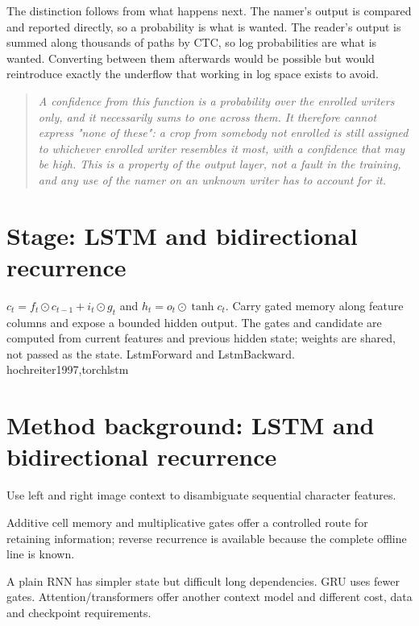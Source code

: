 The distinction follows from what happens next. The namer's output is compared and reported directly, so a probability is what is wanted. The reader's output is summed along thousands of paths by CTC, so log probabilities are what is wanted. Converting between them afterwards would be possible but would reintroduce exactly the underflow that working in log space exists to avoid.


\begin{quote}\small\itshape A confidence from this function is a probability over the enrolled writers only, and it necessarily sums to one across them. It therefore cannot express "none of these": a crop from somebody not enrolled is still assigned to whichever enrolled writer resembles it most, with a confidence that may be high. This is a property of the output layer, not a fault in the training, and any use of the namer on an unknown writer has to account for it.\end{quote}


\section*{Stage: LSTM and bidirectional recurrence}
{$c_t=f_t\odot c_{t-1}+i_t\odot g_t$ and $h_t=o_t\odot\tanh c_t$.}
{Carry gated memory along feature columns and expose a bounded hidden output.
The gates and candidate are computed from current features and previous
hidden state; weights are shared, not passed as the state.}
{LstmForward and LstmBackward.}
{hochreiter1997,torchlstm}


\section{Method background: LSTM and bidirectional recurrence}\label{method:lstm}
Use left and right image context to disambiguate sequential character features.


Additive cell memory and multiplicative gates offer a controlled route for retaining information; reverse recurrence is available because the complete offline line is known.


A plain RNN has simpler state but difficult long dependencies. GRU uses fewer gates. Attention/transformers offer another context model and different cost, data and checkpoint requirements.


